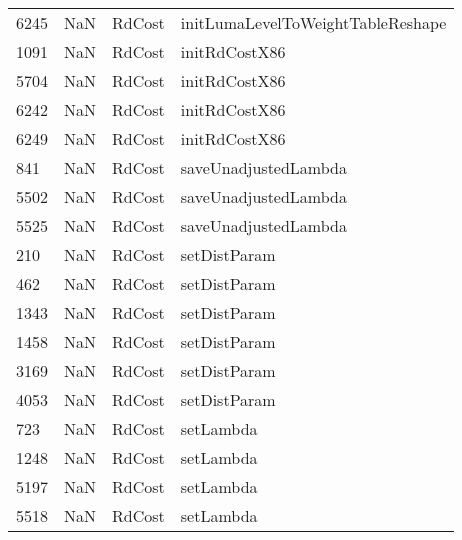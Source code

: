 \begin{tabular}{llll}
6245 &                   NaN &                     RdCost &         initLumaLevelToWeightTableReshape \\
1091 &                   NaN &                     RdCost &                             initRdCostX86 \\
5704 &                   NaN &                     RdCost &                             initRdCostX86 \\
6242 &                   NaN &                     RdCost &                             initRdCostX86 \\
6249 &                   NaN &                     RdCost &                             initRdCostX86 \\
841  &                   NaN &                     RdCost &                      saveUnadjustedLambda \\
5502 &                   NaN &                     RdCost &                      saveUnadjustedLambda \\
5525 &                   NaN &                     RdCost &                      saveUnadjustedLambda \\
210  &                   NaN &                     RdCost &                              setDistParam \\
462  &                   NaN &                     RdCost &                              setDistParam \\
1343 &                   NaN &                     RdCost &                              setDistParam \\
1458 &                   NaN &                     RdCost &                              setDistParam \\
3169 &                   NaN &                     RdCost &                              setDistParam \\
4053 &                   NaN &                     RdCost &                              setDistParam \\
723  &                   NaN &                     RdCost &                                 setLambda \\
1248 &                   NaN &                     RdCost &                                 setLambda \\
5197 &                   NaN &                     RdCost &                                 setLambda \\
5518 &                   NaN &                     RdCost &                                 setLambda \\

\end{tabular}

